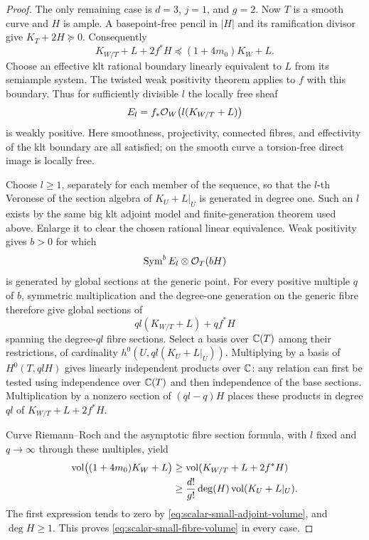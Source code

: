 \begin{proof}
The only remaining case is $d=3$, $j=1$, and $g=2$.  Now $T$ is a
smooth curve and $H$ is ample.  A basepoint-free pencil in $|H|$ and
its ramification divisor give $K_T+2H\succeq0$.  Consequently
\begin{equation}\label{eq:scalar-relative-domination}
 K_{W/T}+L+2f^*H\preceq(1+4m_0)K_W+L.
\end{equation}
Choose an effective klt rational boundary linearly equivalent to $L$
from its semiample system.  The twisted weak positivity theorem
\cite[Theorem~1.1]{FujinoWeakPositivity} applies to $f$ with this
boundary.  Thus for sufficiently divisible $l$ the locally free sheaf
\[
 E_l=f_*\mathcal O_W\bigl(l(K_{W/T}+L)\bigr)
\]
is weakly positive.  Here smoothness, projectivity, connected fibres,
and effectivity of the klt boundary are all satisfied; on the smooth
curve a torsion-free direct image is locally free.

Choose $l\ge1$, separately for each member of the sequence, so that
the $l$-th Veronese of the section algebra of $K_U+L|_U$ is generated
in degree one.  Such an $l$ exists by the same big klt adjoint model
and finite-generation theorem used above.  Enlarge it to clear the
chosen rational linear equivalence.  Weak positivity gives $b>0$
for which
\[
 \operatorname{Sym}^bE_l\otimes\mathcal O_T(bH)
\]
is generated by global sections at the generic point.  For every
positive multiple $q$ of $b$, symmetric multiplication and the
degree-one generation on the generic fibre therefore give global
sections of
\[
 ql(K_{W/T}+L)+qf^*H
\]
spanning the degree-$ql$ fibre sections.  Select a basis over
$\mathbb C(T)$ among their restrictions, of cardinality
$h^0(U,ql(K_U+L|_U))$.  Multiplying by a basis of $H^0(T,qlH)$
gives linearly independent products over $\mathbb C$: any relation can
first be tested using independence over $\mathbb C(T)$ and then independence
of the base sections.  Multiplication by a nonzero section of
$(ql-q)H$ places these products in degree $ql$ of
$K_{W/T}+L+2f^*H$.

Curve Riemann--Roch and the asymptotic fibre section formula, with
$l$ fixed and $q\to\infty$ through these multiples, yield
\begin{align}
 \operatorname{vol}\bigl((1+4m_0)K_W+L\bigr)
 &\ge\operatorname{vol}(K_{W/T}+L+2f^*H)\notag\\
 &\ge\frac{d!}{g!}\deg(H)\operatorname{vol}(K_U+L|_U).
 \label{eq:scalar-weak-positive-volume}
\end{align}
The first expression tends to zero by
\eqref{eq:scalar-small-adjoint-volume}, and $\deg H\ge1$.
This proves \eqref{eq:scalar-small-fibre-volume} in every case.

\end{proof}

